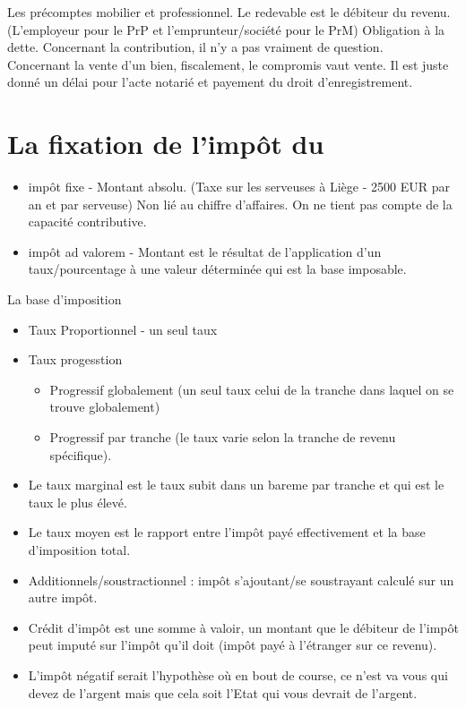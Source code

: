 \documentclass{book}
\begin{document}
Les précomptes mobilier et professionnel. Le redevable est le débiteur du revenu. (L'employeur pour le PrP et l'emprunteur/société pour le PrM) Obligation à la dette. Concernant la contribution, il n'y a pas vraiment de question.\\

Concernant la vente d'un bien, fiscalement, le compromis vaut vente. Il est juste donné un délai pour l'acte notarié et payement du droit d'enregistrement.

\section{La fixation de l'impôt du}

\begin{itemize}
\item impôt fixe - Montant absolu. (Taxe sur les serveuses à Liège - 2500 EUR par an et par serveuse) Non lié au chiffre d'affaires. On ne tient pas compte de la capacité contributive.
\item impôt ad valorem - Montant est le résultat de l'application d'un taux/pourcentage à une valeur déterminée qui est la base imposable. 
\end{itemize}
\null
La base d'imposition\\

\begin{itemize}
\item Taux Proportionnel - un seul taux
\item Taux progesstion
\begin{itemize}
\item Progressif globalement (un seul taux celui de la tranche dans laquel on se trouve globalement) 
\item Progressif par tranche (le taux varie selon la tranche de revenu spécifique).
\end{itemize}
\item Le taux marginal est le taux subit dans un bareme par tranche et qui est le taux le plus élevé.
\item Le taux moyen est le rapport entre l'impôt payé effectivement et la base d'imposition total.
\item Additionnels/soustractionnel : impôt s'ajoutant/se soustrayant calculé sur un autre impôt.
\item Crédit d'impôt est une somme à valoir, un montant que le débiteur de l'impôt peut imputé sur l'impôt qu'il doit (impôt payé à l'étranger sur ce revenu).
\item L'impôt négatif serait l'hypothèse où en bout de course, ce n'est va vous qui devez de l'argent mais que cela soit l'Etat qui vous devrait de l'argent.
\end{itemize}
\end{document}

